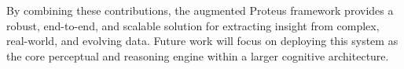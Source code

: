 \documentclass{article}
\begin{document}
By combining these contributions, the augmented Proteus framework provides a robust, end-to-end, and scalable solution for extracting insight from complex, real-world, and evolving data. Future work will focus on deploying this system as the core perceptual and reasoning engine within a larger cognitive architecture.



\end{document}
